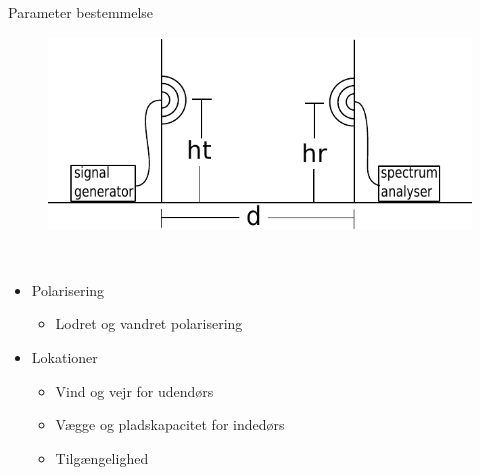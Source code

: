 \begin{frame}{Parameter bestemmelse}
\begin{figure}[!htbp]
	\centering
	\includegraphics[width = 0.8\columnwidth]{figures/setup.pdf}
\end{figure}
\begin{minipage}{0.15\textwidth}
 \textcolor{white}{.}  
\end{minipage}%
\begin{minipage}{0.8\textwidth}
\begin{itemize}
\item Polarisering
\begin{itemize}
\item Lodret og vandret polarisering
\end{itemize}
\item Lokationer
\begin{itemize}
\item Vind og vejr for udendørs
\item Vægge og pladskapacitet for indedørs
\item Tilgængelighed
\end{itemize}
\end{itemize}
\end{minipage}
\end{frame}

